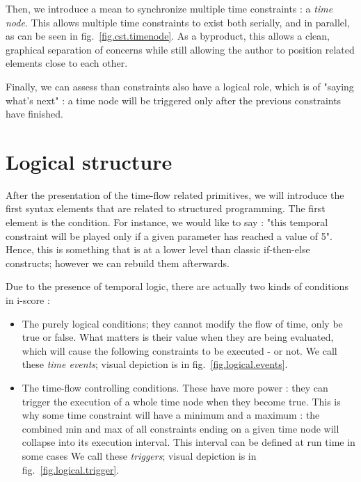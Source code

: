 \documentclass{sigchi}
\begin{document}
Then, we introduce a mean to synchronize multiple time constraints : a \textit{time node}. 
This allows multiple time constraints to exist both serially, and in parallel, as can be seen in fig.~\ref{fig.cst.timenode}. 
As a byproduct, this allows a clean, graphical separation of concerns while still allowing the author to position related elements close to each other. %

Finally, we can assess than constraints also have a logical role, which is of "saying what's next" : a time node will be triggered only after the previous constraints have finished.

\section{Logical structure}\label{sec.structured}
After the presentation of the time-flow related primitives, we will introduce the first syntax elements that are related to structured programming.
The first element is the condition. For instance, we would like to say : "this temporal constraint will be played only if a given parameter has reached a value of 5".
Hence, this is something that is at a lower level than classic if-then-else constructs; however we can rebuild them afterwards.

Due to the presence of temporal logic, there are actually two kinds of conditions in i-score : 
\begin{itemize}
	\item The purely logical conditions; they cannot modify the flow of time, only be true or false. What matters is their value when they are being evaluated, which will cause the following constraints to be executed - or not. We call these \textit{time events}; visual depiction is in fig.~\ref{fig.logical.events}.
	\item The time-flow controlling conditions. These have more power : they can trigger the execution of a whole time node when they become true. This is why some time constraint will have a minimum and a maximum : the combined min and max of all constraints ending on a given time node will collapse into its execution interval. This interval can be defined at run time in some cases %
	We call these \textit{triggers}; visual depiction is in fig.~\ref{fig.logical.trigger}.
\end{itemize}
\end{document}
